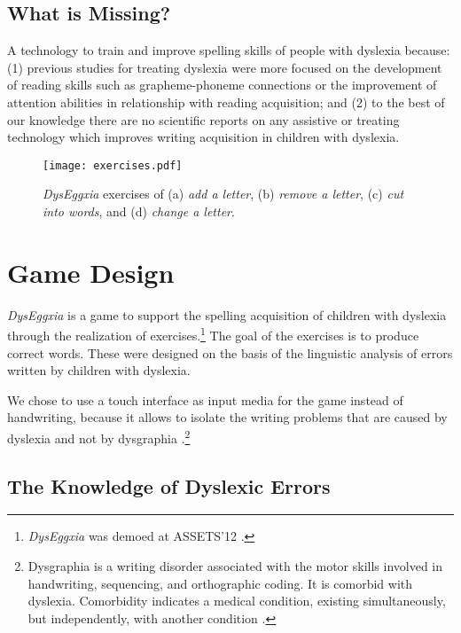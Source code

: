 \documentclass[letterpaper]{sig-alternate-2013}
\begin{document}
\subsection{What is Missing?}


A technology to train and improve spelling skills of people with dyslexia because: (1) previous studies for treating dyslexia were more focused on the development of reading skills such as grapheme-phoneme connections or the improvement of attention abilities in relationship with reading acquisition; and (2) to the best of our knowledge there are no scientific reports on any assistive or treating technology which improves writing acquisition in children with dyslexia.


\begin{figure}[tb!]
	\centering
	\texttt{[image: exercises.pdf]}
		\vspace{-0.5cm}
	\caption{{\it DysEggxia} exercises of (a) {\it add a letter}, (b) {\it remove a letter}, (c) {\it cut into words}, and (d) {\it change a letter}.}
	\label{dysapp}
		\vspace{-0.3cm}
\end{figure}

\section{Game Design}
\label{app}
{\it DysEggxia} is a game to support the spelling acquisition of children with dyslexia through the realization of exercises.\footnote{{\it DysEggxia} was demoed at ASSETS'12 \cite{Dyseggxia2012}.} The goal of the exercises is to produce correct words. These were designed on the basis of the linguistic analysis of errors written by children with dyslexia.

We chose to use a touch interface as input media for the game instead of handwriting, because it allows to isolate the writing problems that are caused by dyslexia and not by dysgraphia \cite{Romani1999}.\footnote{Dysgraphia is a writing disorder associated with the motor skills involved in handwriting, sequencing, and orthographic coding. It is comorbid with dyslexia. Comorbidity indicates a medical condition, existing simultaneously, but independently, with another condition \cite{Nicolson2011}.}


\subsection{The Knowledge of Dyslexic Errors}
\end{document}
